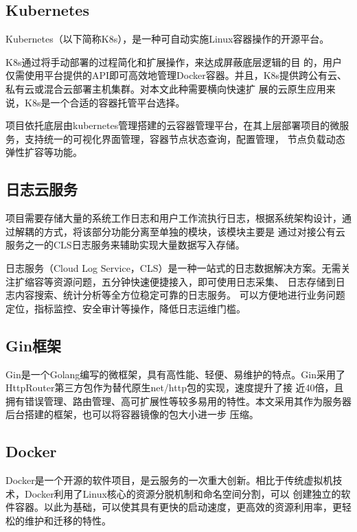 \subsection{Kubernetes}
Kubernetes（以下简称K8s），是一种可自动实施Linux容器操作的开源平台。

K8s通过将手动部署的过程简化和扩展操作，来达成屏蔽底层逻辑的目
的，用户仅需使用平台提供的API即可高效地管理Docker容器。并且，K8s提供跨公有云、私有云或混合云部署主机集群。对本文此种需要横向快速扩
展的云原生应用来说，K8s是一个合适的容器托管平台选择\cite{zhong2021machine}。

项目依托底层由kubernetes管理搭建的云容器管理平台，在其上层部署项目的微服务，支持统一的可视化界面管理，容器节点状态查询，配置管理，
节点负载动态弹性扩容等功能\cite{Tuli_2022}。

\subsection{日志云服务}
项目需要存储大量的系统工作日志和用户工作流执行日志，根据系统架构设计，通过解耦的方式，将该部分功能分离至单独的模块，该模块主要是
通过对接公有云服务之一的CLS日志服务来辅助实现大量数据写入存储\cite{othe1}。

日志服务（Cloud Log Service，CLS）是一种一站式的日志数据解决方案。无需关注扩缩容等资源问题，五分钟快速便捷接入，即可使用日志采集、
日志存储到日志内容搜索、统计分析等全方位稳定可靠的日志服务。 可以方便地进行业务问题定位，指标监控、安全审计等操作，降低日志运维门槛。

\subsection{Gin框架}
Gin是一个Golang编写的微框架，具有高性能、轻便、易维护的特点。Gin采用了HttpRouter第三方包作为替代原生net/http包的实现，速度提升了接
近40倍，且拥有错误管理、路由管理、高可扩展性等较多易用的特性。本文采用其作为服务器后台搭建的框架，也可以将容器镜像的包大小进一步
压缩。

\subsection{Docker}
Docker是一个开源的软件项目，是云服务的一次重大创新。相比于传统虚拟机技术，Docker利用了Linux核心的资源分脱机制和命名空间分割，可以
创建独立的软件容器。以此为基础，可以使其具有更快的启动速度，更高效的资源利用率，更轻松的维护和迁移的特性。


